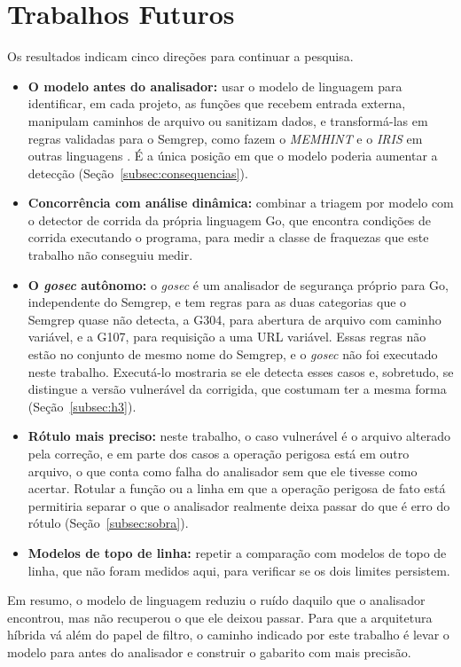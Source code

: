 \section{Trabalhos Futuros}
\label{sec:futuros}

Os resultados indicam cinco direções para continuar a pesquisa.

\begin{itemize}
    \item \textbf{O modelo antes do analisador:} usar o modelo de linguagem para identificar, em cada projeto, as funções que recebem entrada externa, manipulam caminhos de arquivo ou sanitizam dados, e transformá-las em regras validadas para o Semgrep, como fazem o \textit{MEMHINT} e o \textit{IRIS} em outras linguagens \cite{huang2026memhint, li2025iris}. É a única posição em que o modelo poderia aumentar a detecção (Seção~\ref{subsec:consequencias}).
    \item \textbf{Concorrência com análise dinâmica:} combinar a triagem por modelo com o detector de corrida da própria linguagem Go, que encontra condições de corrida executando o programa, para medir a classe de fraquezas que este trabalho não conseguiu medir.
    \item \textbf{O \textit{gosec} autônomo:} o \textit{gosec} é um analisador de segurança próprio para Go, independente do Semgrep, e tem regras para as duas categorias que o Semgrep quase não detecta, a G304, para abertura de arquivo com caminho variável, e a G107, para requisição a uma URL variável. Essas regras não estão no conjunto de mesmo nome do Semgrep, e o \textit{gosec} não foi executado neste trabalho. Executá-lo mostraria se ele detecta esses casos e, sobretudo, se distingue a versão vulnerável da corrigida, que costumam ter a mesma forma (Seção~\ref{subsec:h3}).
    \item \textbf{Rótulo mais preciso:} neste trabalho, o caso vulnerável é o arquivo alterado pela correção, e em parte dos casos a operação perigosa está em outro arquivo, o que conta como falha do analisador sem que ele tivesse como acertar. Rotular a função ou a linha em que a operação perigosa de fato está permitiria separar o que o analisador realmente deixa passar do que é erro do rótulo (Seção~\ref{subsec:sobra}).
    \item \textbf{Modelos de topo de linha:} repetir a comparação com modelos de topo de linha, que não foram medidos aqui, para verificar se os dois limites persistem.
\end{itemize}

Em resumo, o modelo de linguagem reduziu o ruído daquilo que o analisador encontrou, mas não recuperou o que ele deixou passar. Para que a arquitetura híbrida vá além do papel de filtro, o caminho indicado por este trabalho é levar o modelo para antes do analisador e construir o gabarito com mais precisão.
